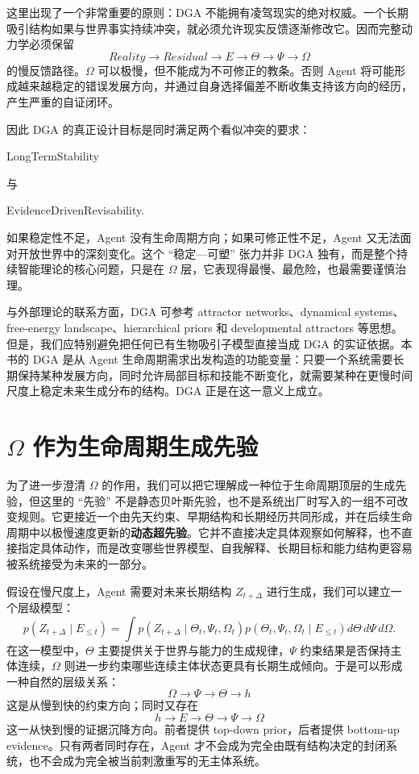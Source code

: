 这里出现了一个非常重要的原则：DGA 不能拥有凌驾现实的绝对权威。一个长期吸引结构如果与世界事实持续冲突，就必须允许现实反馈逐渐修改它。因而完整动力学必须保留
\[
Reality
\rightarrow
Residual
\rightarrow
E
\rightarrow
\Theta
\rightarrow
\Psi
\rightarrow
\Omega
\]
的慢反馈路径。$\Omega$ 可以极慢，但不能成为不可修正的教条。否则 Agent 将可能形成越来越稳定的错误发展方向，并通过自身选择偏差不断收集支持该方向的经历，产生严重的自证闭环。

因此 DGA 的真正设计目标是同时满足两个看似冲突的要求：
\begin{statementbox}
LongTermStability
\end{statementbox}
与
\begin{statementbox}
EvidenceDrivenRevisability.
\end{statementbox}
如果稳定性不足，Agent 没有生命周期方向；如果可修正性不足，Agent 又无法面对开放世界中的深刻变化。这个 ``稳定—可塑'' 张力并非 DGA 独有，而是整个持续智能理论的核心问题，只是在 $\Omega$ 层，它表现得最慢、最危险，也最需要谨慎治理。

与外部理论的联系方面，DGA 可参考 attractor networks、dynamical systems、free-energy landscape、hierarchical priors 和 developmental attractors 等思想。但是，我们应特别避免把任何已有生物吸引子模型直接当成 DGA 的实证依据。本书的 DGA 是从 Agent 生命周期需求出发构造的功能变量：只要一个系统需要长期保持某种发展方向，同时允许局部目标和技能不断变化，就需要某种在更慢时间尺度上稳定未来生成分布的结构。DGA 正是在这一意义上成立。

\section{$\Omega$ 作为生命周期生成先验}

为了进一步澄清 $\Omega$ 的作用，我们可以把它理解成一种位于生命周期顶层的生成先验，但这里的 ``先验'' 不是静态贝叶斯先验，也不是系统出厂时写入的一组不可改变规则。它更接近一个由先天约束、早期结构和长期经历共同形成，并在后续生命周期中以极慢速度更新的\textbf{动态超先验}。它并不直接决定具体观察如何解释，也不直接指定具体动作，而是改变哪些世界模型、自我解释、长期目标和能力结构更容易被系统接受为未来的一部分。

假设在慢尺度上，Agent 需要对未来长期结构 $Z_{t+\Delta}$ 进行生成，我们可以建立一个层级模型：
\[
p
\left(
Z_{t+\Delta}
\mid
E_{\leq t}
\right)
=
\int
p
\left(
Z_{t+\Delta}
\mid
\Theta_t,\Psi_t,\Omega_t
\right)
p
\left(
\Theta_t,\Psi_t,\Omega_t
\mid
E_{\leq t}
\right)
d\Theta\,d\Psi\,d\Omega.
\]
在这一模型中，$\Theta$ 主要提供关于世界与能力的生成规律，$\Psi$ 约束结果是否保持主体连续，$\Omega$ 则进一步约束哪些连续主体状态更具有长期生成倾向。于是可以形成一种自然的层级关系：
\[
\boxed{
\Omega
\rightarrow
\Psi
\rightarrow
\Theta
\rightarrow
h
}
\]
这是从慢到快的约束方向；同时又存在
\[
\boxed{
h
\rightarrow
E
\rightarrow
\Theta
\rightarrow
\Psi
\rightarrow
\Omega
}
\]
这一从快到慢的证据沉降方向。前者提供 top-down prior，后者提供 bottom-up evidence。只有两者同时存在，Agent 才不会成为完全由既有结构决定的封闭系统，也不会成为完全被当前刺激重写的无主体系统。

